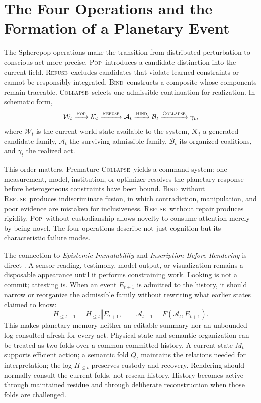 \documentclass[11pt]{article}
\newcommand{\Pop}{\textsc{Pop}}
\newcommand{\Refuse}{\textsc{Refuse}}
\newcommand{\Bind}{\textsc{Bind}}
\newcommand{\Collapse}{\textsc{Collapse}}
\begin{document}
\section{The Four Operations and the Formation of a Planetary Event}
\label{sec:four-operations}

The Spherepop operations make the transition from distributed perturbation to conscious act more precise. \Pop\ introduces a candidate distinction into the current field. \Refuse\ excludes candidates that violate learned constraints or cannot be responsibly integrated. \Bind\ constructs a composite whose components remain traceable. \Collapse\ selects one admissible continuation for realization. In schematic form,
\[
\mathcal{W}_t
\xrightarrow{\Pop}
\mathcal{K}_t
\xrightarrow{\Refuse}
\mathcal{A}_t
\xrightarrow{\Bind}
\mathcal{B}_t
\xrightarrow{\Collapse}
\gamma_t,
\]
where $\mathcal{W}_t$ is the current world-state available to the system, $\mathcal{K}_t$ a generated candidate family, $\mathcal{A}_t$ the surviving admissible family, $\mathcal{B}_t$ its organized coalitions, and $\gamma_t$ the realized act.

This order matters. Premature \Collapse\ yields a command system: one measurement, model, institution, or optimizer resolves the planetary response before heterogeneous constraints have been bound. \Bind\ without \Refuse\ produces indiscriminate fusion, in which contradiction, manipulation, and poor evidence are mistaken for inclusiveness. \Refuse\ without repair produces rigidity. \Pop\ without custodianship allows novelty to consume attention merely by being novel. The four operations describe not just cognition but its characteristic failure modes.

The connection to \emph{Epistemic Immutability} and \emph{Inscription Before Rendering} is direct \cite{flyxionEI,flyxionIR}. A sensor reading, testimony, model output, or visualization remains a disposable appearance until it performs constraining work. Looking is not a commit; attesting is. When an event $E_{t+1}$ is admitted to the history, it should narrow or reorganize the admissible family without rewriting what earlier states claimed to know:
\[
H_{\leq t+1}=H_{\leq t}\mathbin{\Vert}E_{t+1},
\qquad
\mathcal{A}_{t+1}=F(\mathcal{A}_t,E_{t+1}).
\]
This makes planetary memory neither an editable summary nor an unbounded log consulted afresh for every act. Physical state and semantic organization can be treated as two folds over a common committed history. A current state $M_t$ supports efficient action; a semantic fold $Q_t$ maintains the relations needed for interpretation; the log $H_{\leq t}$ preserves custody and recovery. Rendering should normally consult the current folds, not rescan history. History becomes active through maintained residue and through deliberate reconstruction when those folds are challenged.
\end{document}
